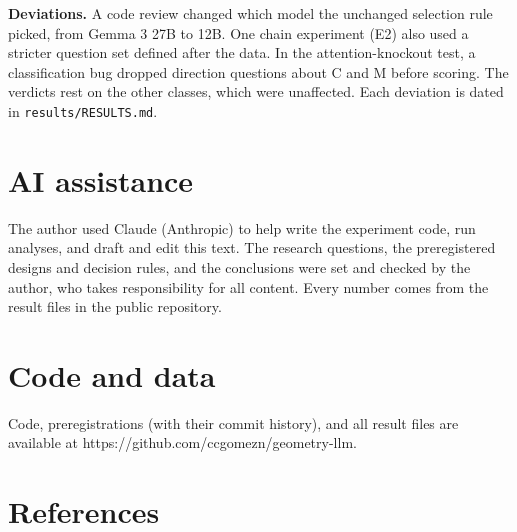 \documentclass[
  11pt,
]{article}
\begin{document}
\textbf{Deviations.} A code review changed which model the unchanged
selection rule picked, from Gemma 3 27B to 12B. One chain experiment
(E2) also used a stricter question set defined after the data. In the
attention-knockout test, a classification bug dropped direction
questions about C and M before scoring. The verdicts rest on the other
classes, which were unaffected. Each deviation is dated in
\texttt{results/RESULTS.md}.

\section{AI assistance}\label{ai-assistance}

The author used Claude (Anthropic) to help write the experiment code,
run analyses, and draft and edit this text. The research questions, the
preregistered designs and decision rules, and the conclusions were set
and checked by the author, who takes responsibility for all content.
Every number comes from the result files in the public repository.

\section{Code and data}\label{code-and-data}

Code, preregistrations (with their commit history), and all result files
are available at https://github.com/ccgomezn/geometry-llm.

\section{References}\label{references}
\end{document}
